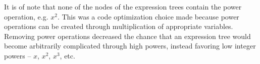 It is of note that none of the nodes of the expression trees contain the power operation, e.g. $x^2$.  This was a code optimization choice made because power operations can be created through multiplication of appropriate variables.  Removing power operations decreased the chance that an expression tree would become arbitrarily complicated through high powers, instead favoring low integer powers -- $x$, $x^2$, $x^3$, etc.

